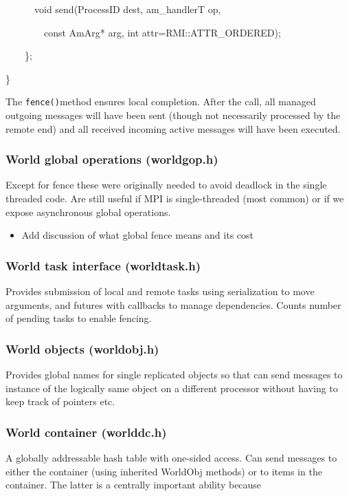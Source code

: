 \documentclass[letterpaper]{article}
\newcommand\liststyleLvii{%
\renewcommand\labelitemi{${\bullet}$}
\renewcommand\labelitemii{${\circ}$}
\renewcommand\labelitemiii{${\blacksquare}$}
\renewcommand\labelitemiv{${\bullet}$}
}
\begin{document}
{\ttfamily
\ \ \ \ \ \ void send(ProcessID dest, am\_handlerT op, }

{\ttfamily
\ \ \ \ \ \ \ \ const AmArg* arg, int attr=RMI::ATTR\_ORDERED);}

{\ttfamily
\ \ \ \ \};}

{\ttfamily
\}}


\bigskip

The \texttt{fence()}method ensures local completion. After the call, all managed outgoing messages will have been sent
(though not necessarily processed by the remote end) and all received incoming active messages will have been executed.

\subsubsection{World global operations (worldgop.h)}
Except for fence these were originally needed to avoid deadlock in the single threaded code. Are still useful if MPI is
single-threaded (most common) or if we expose asynchronous global operations.

\liststyleLvii
\begin{itemize}
\item Add discussion of what global fence means and its cost
\end{itemize}

\bigskip

\subsubsection{World task interface (worldtask.h)}
Provides submission of local and remote tasks using serialization to move arguments, and futures with callbacks to
manage dependencies. Counts number of pending tasks to enable fencing.

\subsubsection{World objects (worldobj.h)}
Provides global names for single replicated objects so that can send messages to instance of the logically same object
on a different processor without having to keep track of pointers etc.

\subsubsection[World container (worlddc.h)]{World container (worlddc.h)}
A globally addressable hash table with one-sided access. Can send messages to either the container (using inherited
WorldObj methods) or to items in the container. The latter is a centrally important ability because
\end{document}

